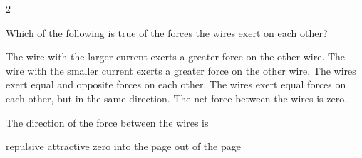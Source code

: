 \documentclass{../../../oss-apphys-exam}
\begin{document}
\begin{multicols*}{2}
\begin{questions}
%    


    \question Which of the following is true of the forces the wires exert on
    each other?
    \begin{choices}
      \choice The wire with the larger current exerts a greater force on the
      other wire.
      \choice The wire with the smaller current exerts a greater force on the
      other wire.
      \choice The wires exert equal and opposite forces on each other.
      \choice The wires exert equal forces on each other, but in the same
      direction.
      \choice The net force between the wires is zero.
    \end{choices}
    \label{q:2curr1}
    \vspace{.7in}
    
    \question The direction of the force between the wires is
    \begin{choices}
      \choice repulsive
      \choice attractive
      \choice zero
      \choice into the page
      \choice out of the page
    \end{choices}
    \label{q:2curr2}
    \vspace{.7in}
    

\end{questions}
\end{multicols*}
\end{document}
